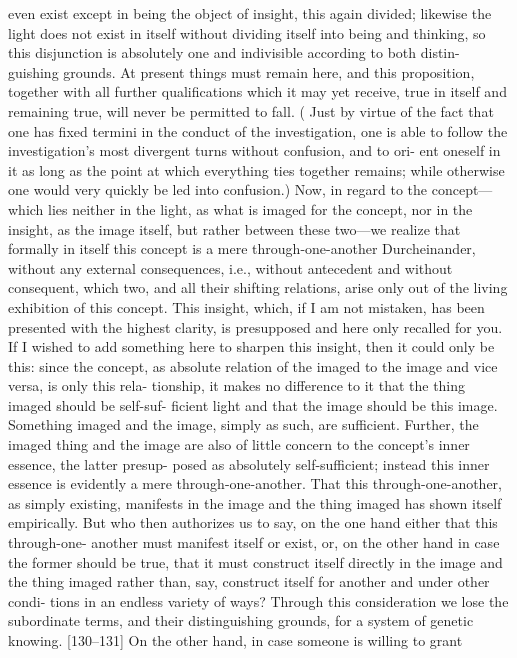 even exist except in being the object of insight, this again divided; likewise the
light does not exist in itself without dividing itself into being and thinking, so
this disjunction is absolutely one and indivisible according to both distin-
guishing grounds. At present things must remain here, and this proposition,
together with all further qualifications which it may yet receive, true in itself
and remaining true, will never be permitted to fall. ( Just by virtue of the fact
that one has fixed termini in the conduct of the investigation, one is able to
follow the investigation’s most divergent turns without confusion, and to ori-
ent oneself in it as long as the point at which everything ties together remains;
while otherwise one would very quickly be led into confusion.)
Now, in regard to the concept—which lies neither in the light, as what
is imaged for the concept, nor in the insight, as the image itself, but rather
between these two—we realize that formally in itself this concept is a mere
through-one-another {Durcheinander}, without any external consequences, i.e.,
without antecedent and without consequent, which two, and all their shifting
relations, arise only out of the living exhibition of this concept. This insight,
which, if I am not mistaken, has been presented with the highest clarity, is
presupposed and here only recalled for you. If I wished to add something here
to sharpen this insight, then it could only be this: since the concept, as
absolute relation of the imaged to the image and vice versa, is only this rela-
tionship, it makes no difference to it that the thing imaged should be self-suf-
ficient light and that the image should be this image. Something imaged and
the image, simply as such, are sufficient. Further, the imaged thing and the
image are also of little concern to the concept’s inner essence, the latter presup-
posed as absolutely self-sufficient; instead this inner essence is evidently a
mere through-one-another. That this through-one-another, as simply existing,
manifests in the image and the thing imaged has shown itself empirically. But
who then authorizes us to say, on the one hand either that this through-one-
another must manifest itself or exist, or, on the other hand in case the former
should be true, that it must construct itself directly in the image and the thing
imaged rather than, say, construct itself for another and under other condi-
tions in an endless variety of ways? Through this consideration we lose the
subordinate terms, and their distinguishing grounds, for a system of genetic
knowing. [130–131] On the other hand, in case someone is willing to grant
